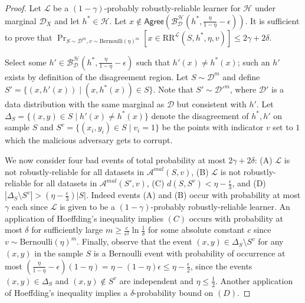 \documentclass[11pt]{article}
\newcommand{\CR}{\text{RR}}
\newcommand{\0}{\mathbf{0}}
\newcommand{\1}{\mathbf{1}}
\newcommand{\cA}{\mathcal{A}}
\newcommand{\cB}{\mathcal{B}}
\newcommand{\cD}{\mathcal{D}}
\newcommand{\cH}{\mathcal{H}}
\newcommand{\cL}{\mathcal{L}}
\newcommand{\Agree}{\mathsf{Agree}}
\begin{document}
\begin{proof}
Let  $\cL$ be a $(1-\gamma)$-probably robustly-reliable learner for $\cH$ under marginal $\cD_X$ and let $h^*\in\cH$.  Let $x\not\in \Agree(\cB_{\cD}^\cH(h^*,\frac{\eta}{1-\eta}-\epsilon))$. It is sufficient to prove that $\Pr_{S \sim \cD^m,v \sim \mbox{Bernoulli}(\eta)^m}[x \in \CR^\cL(S,h^*,\eta,v) ] \leq 2\gamma+2\delta$.

Select some $h' \in \cB_{\cD}^\cH(h^*,\frac{\eta}{1-\eta}-\epsilon)$ such that $h'(x)\neq h^*(x)$; such an $h'$ exists by definition of the disagreement region.  Let $S \sim \cD^m$ and define $S'=\{(x,h'(x))\mid (x,h^*(x))\in S\}$. Note that $S'\sim\cD'^m$, where $\cD'$ is a data distribution with the same marginal as $\cD$ but consistent with $h'$. Let $\Delta_S=\{(x,y)\in S\mid h'(x)\ne h^*(x)\}$ denote the disagreement of $h^*,h'$ on sample $S$ and  $S^v=\{(x_i,y_i)\in S\mid v_i=1\}$ be the points with indicator $v$ set to $1$ which the malicious adversary gets to corrupt.


We now consider four bad events of total probability at most $2\gamma+2\delta$: (A) $\cL$ is not robustly-reliable for all datasets in $\cA^{mal}(S,v)$, (B) $\cL$ is not robustly-reliable for all datasets in $\cA^{mal}(S',v)$, (C) $d(S,S^v) < \eta - \frac{\epsilon}{3}$, and (D) $|\Delta_S\setminus S^v|>(\eta - \frac{\epsilon}{3})|S|$. Indeed events (A) and (B) occur with probability at most $\gamma$ each since $\cL$ is given to be a $(1-\gamma)$-probably robustly-reliable learner. An application of Hoeffding's inequality implies $(C)$ occurs with probability at most $\delta$ for sufficiently large $m\ge \frac{c}{\epsilon^2}\ln\frac{1}{\delta}$ for some absolute constant $c$ since $v \sim \mbox{Bernoulli}(\eta)^m$. Finally, observe that the event $(x,y)\in\Delta_S\setminus S^v$ for any $(x,y)$ in the sample $S$ is a Bernoulli event with probability of occurrence at most $\left(\frac{\eta}{1-\eta}-\epsilon\right)(1-\eta)=\eta-(1-\eta)\epsilon\le \eta-\frac{\epsilon}{2}$, since the events $(x,y)\in\Delta_S$ and $(x,y)\notin S^v$ are independent and $\eta\le \frac{1}{2}$. Another application of Hoeffding's inequality implies a $\delta$-probability bound on $(D)$.



\end{proof}
\end{document}
